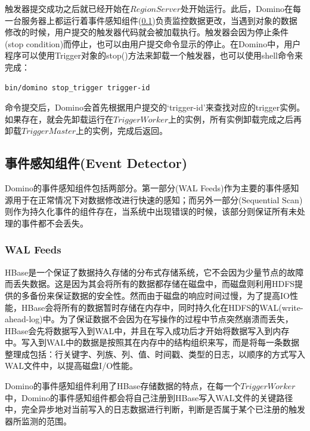 触发器提交成功之后就已经开始在$RegionServer$处开始运行。此后，Domino在每一台服务器上都运行着事件感知组件(\ref{subsection:feed})负责监控数据更改，当遇到对象的数据修改的时候，用户提交的触发器代码就会被加载执行。触发器会因为停止条件(stop condition)而停止，也可以由用户提交命令显示的停止。在Domino中，用户程序可以使用Trigger对象的stop()方法来卸载一个触发器，也可以使用shell命令来完成：
\begin{lstlisting}[language=bash]
	bin/domino stop_trigger trigger-id
\end{lstlisting}
命令提交后，Domino会首先根据用户提交的‘trigger-id’来查找对应的trigger实例。如果存在，就会先卸载运行在$TriggerWorker$上的实例，所有实例卸载完成之后再卸载$TriggerMaster$上的实例，完成后返回。

\subsection{事件感知组件(Event Detector)}
\label{subsection:feed}
Domino的事件感知组件包括两部分。第一部分(WAL Feeds)作为主要的事件感知源用于在正常情况下对数据修改进行快速的感知；而另外一部分(Sequential Scan)则作为持久化事件的组件存在，当系统中出现错误的时候，该部分则保证所有未处理的事件都不会丢失。

\subsubsection{WAL Feeds}

HBase是一个保证了数据持久存储的分布式存储系统，它不会因为少量节点的故障而丢失数据。这是因为其会将所有的数据都存储在磁盘中，而磁盘则利用HDFS提供的多备份来保证数据的安全性。然而由于磁盘的响应时间过慢，为了提高IO性能，HBase会将所有的数据暂时存储在内存中，同时持久化在HDFS的WAL(write-ahead-log)中。为了保证数据不会因为在写操作的过程中节点突然崩溃而丢失，HBase会先将数据写入到WAL中，并且在写入成功后才开始将数据写入到内存中。写入到WAL中的数据是按照其在内存中的结构组织来写，而是将每一条数据整理成包括：行关键字、列族、列、值、时间戳、类型的日志，以顺序的方式写入WAL文件中，以提高磁盘I/O性能。

Domino的事件感知组件利用了HBase存储数据的特点，在每一个$TriggerWorker$中，Domino的事件感知组件都会将自己注册到HBase写入WAL文件的关键路径中，完全异步地对当前写入的日志数据进行判断，判断是否属于某个已注册的触发器所监测的范围。

